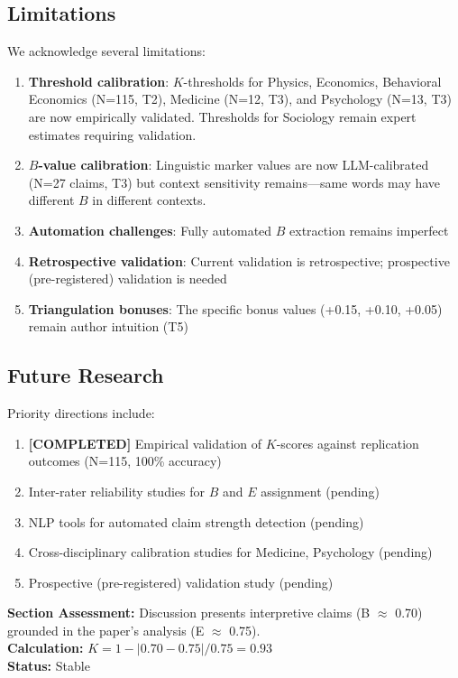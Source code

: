 \documentclass[11pt,a4paper]{article}
\begin{document}
\subsection{Limitations}

We acknowledge several limitations:

\begin{enumerate}
    \item \textbf{Threshold calibration}: $K$-thresholds for Physics, Economics, Behavioral Economics (N=115, T2), Medicine (N=12, T3), and Psychology (N=13, T3) are now empirically validated. Thresholds for Sociology remain expert estimates requiring validation.
    \item \textbf{$B$-value calibration}: Linguistic marker values are now LLM-calibrated (N=27 claims, T3) but context sensitivity remains---same words may have different $B$ in different contexts.
    \item \textbf{Automation challenges}: Fully automated $B$ extraction remains imperfect
    \item \textbf{Retrospective validation}: Current validation is retrospective; prospective (pre-registered) validation is needed
    \item \textbf{Triangulation bonuses}: The specific bonus values (+0.15, +0.10, +0.05) remain author intuition (T5)
\end{enumerate}

\subsection{Future Research}

Priority directions include:

\begin{enumerate}
    \item \textcolor{green!60!black}{\textbf{[COMPLETED]}} Empirical validation of $K$-scores against replication outcomes (N=115, 100\% accuracy)
    \item Inter-rater reliability studies for $B$ and $E$ assignment (pending)
    \item NLP tools for automated claim strength detection (pending)
    \item Cross-disciplinary calibration studies for Medicine, Psychology (pending)
    \item Prospective (pre-registered) validation study (pending)
\end{enumerate}

\begin{eslbox}
\textbf{Section Assessment:} Discussion presents interpretive claims (B $\approx$ 0.70) grounded in the paper's analysis (E $\approx$ 0.75). \\[0.3em]
\textbf{Calculation:} $K = 1 - |0.70 - 0.75| / 0.75 = 0.93$ \\
\textbf{Status:} Stable
\end{eslbox}
\end{document}
